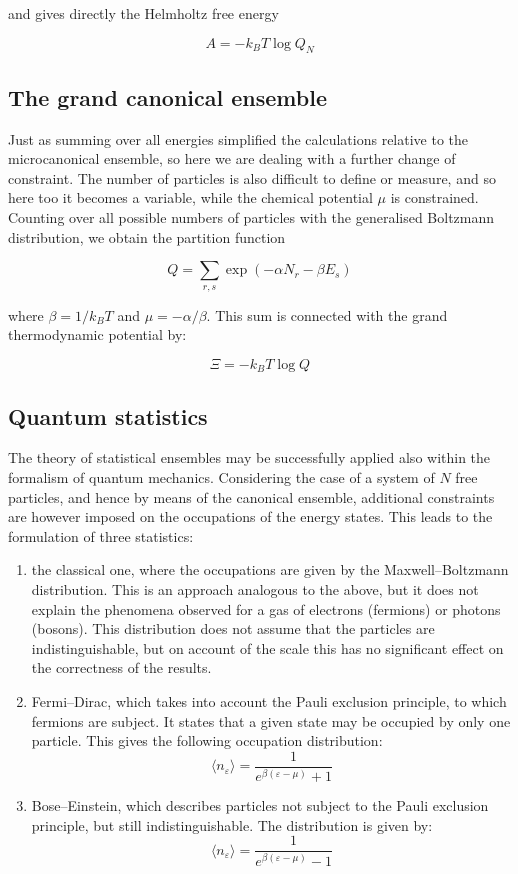 and gives directly the Helmholtz free energy

\[A=-k_BT\log Q_N\]

\subsection{The grand canonical ensemble}

Just as summing over all energies simplified the calculations relative to the microcanonical ensemble, so here we are dealing with a further change of constraint. The number of particles is also difficult to define or measure, and so here too it becomes a variable, while the chemical potential $\mu$ is constrained. Counting over all possible numbers of particles with the generalised Boltzmann distribution, we obtain the partition function

\[Q=\sum_{r,s}\exp\left(-\alpha N_r - \beta E_s\right) \]

where $\beta = 1/k_BT$ and $\mu = - \alpha/\beta$. This sum is connected with the grand thermodynamic potential by:

\[ \Xi = -k_BT\log Q\]

\subsection{Quantum statistics}

The theory of statistical ensembles may be successfully applied also within the formalism of quantum mechanics. Considering the case of a system of $N$ free particles, and hence by means of the canonical ensemble, additional constraints are however imposed on the occupations of the energy states. This leads to the formulation of three statistics:

\begin{enumerate}
    \item the classical one, where the occupations are given by the Maxwell--Boltzmann distribution. This is an approach analogous to the above, but it does not explain the phenomena observed for a gas of electrons (fermions) or photons (bosons). This distribution does not assume that the particles are indistinguishable, but on account of the scale this has no significant effect on the correctness of the results.
    \item Fermi--Dirac, which takes into account the Pauli exclusion principle, to which fermions are subject. It states that a given state may be occupied by only one particle. This gives the following occupation distribution:
    \[\langle n_\varepsilon\rangle=\frac{1}{e^{\beta(\varepsilon - \mu)} + 1}\]
    \item Bose--Einstein, which describes particles not subject to the Pauli exclusion principle, but still indistinguishable. The distribution is given by:
    \[\langle n_\varepsilon\rangle=\frac{1}{e^{\beta(\varepsilon - \mu)} - 1}\]
\end{enumerate}

